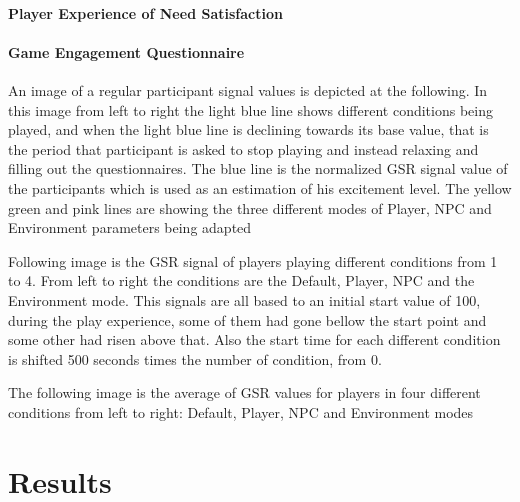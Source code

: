 \paragraph{Player Experience of Need Satisfaction}


\paragraph{Game Engagement Questionnaire}

An image of a regular participant signal values is depicted at
the following. In this image from left to right the light blue line
shows different conditions being played, and when the light blue
line is declining towards its base value, that is the period that
participant is asked to stop playing and instead relaxing and filling
out the questionnaires. The blue line is the normalized GSR signal
value of the participants which is used as an estimation of his
excitement level. The yellow green and pink lines are showing the
three different modes of Player, NPC and Environment parameters
being adapted

Following image is the GSR signal of players playing different
conditions from 1 to 4. From left to right the conditions are the
Default, Player, NPC and the Environment mode. This signals are all
based to an initial start value of 100, during the play experience,
some of them had gone bellow the start point and some other had risen
above that. Also the start time for each different condition is
shifted 500 seconds times the number of condition, from 0.

The following image is the average of GSR values for players in four
different conditions from left to right: Default, Player, NPC and
Environment modes

\section{Results}


